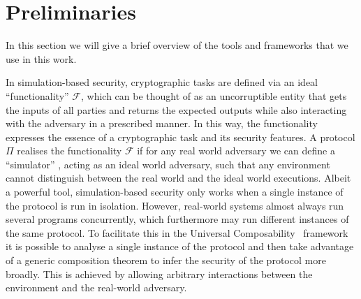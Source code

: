 \section{Preliminaries}
\label{sec:preliminaries}
  In this section we will give a brief overview of the tools and frameworks that
  we use in this work.

In simulation-based security, cryptographic tasks are defined via an
    ideal ``functionality'' $\mathcal{F}$, which can be thought of as 
    an uncorruptible entity that gets the
    inputs of all parties and returns the expected outputs while also interacting with the adversary in a prescribed manner. In this way, the functionality expresses the essence of a cryptographic task and its security features. A protocol $\Pi$ realises the functionality $\mathcal{F}$ if for any  real world adversary
  we can define a ``simulator'' \simulator{}, acting as an ideal world adversary, 
  such that any environment \environment{}
    cannot distinguish between the real world and the ideal world executions.
    Albeit a powerful tool, simulation-based security only works when a single
    instance of the protocol is run in isolation. However, real-world systems
    almost always run several programs concurrently, which furthermore may run
    different instances of the same protocol. To facilitate this in the Universal Composability~\cite{uc}
  framework it is possible to analyse a single instance of the protocol and then take advantage of a generic composition theorem to infer the security of the protocol more broadly. This is achieved by allowing arbitrary interactions between the environment and the real-world adversary. 

